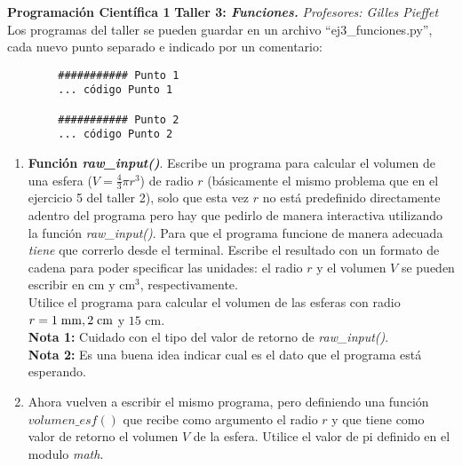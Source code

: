 \documentclass[10pt, twocolumn]{article}
\begin{document}
\noindent
{\Large \bf Programación Científica 1}
\vskip 0.3cm
\noindent
{\large \bf Taller 3: {\it Funciones.}}
\vskip 0.2cm
\noindent
{\it Profesores:  Gilles Pieffet}\\


\noindent
Los programas del taller se pueden guardar en un archivo ``ej3\_funciones.py'', cada nuevo punto separado e indicado por un comentario:
	\begin{verbatim}
		########### Punto 1
		... código Punto 1
		
		########### Punto 2
		... código Punto 2
	\end{verbatim}
	
\begin{enumerate}

	\item {\bf Función \emph{raw\_input()}}. Escribe un programa para calcular el volumen de una esfera ($V = \frac43 \pi r^3$) de radio $r$ (básicamente el mismo problema que en el ejercicio 5 del taller 2), solo que esta vez $r$ no está predefinido directamente adentro del programa pero hay que pedirlo de manera interactiva utilizando la función \emph{raw\_input()}. Para que el programa funcione de manera adecuada \emph{tiene} que correrlo desde el terminal. Escribe el resultado con un formato de cadena para poder specificar las unidades: el radio $r$ y el volumen $V$ se pueden escribir en cm y cm$^3$, respectivamente.\\ 
Utilice el programa para calcular el volumen de las esferas con radio $r = 1\;\rm{mm}, 2\;\rm{cm}$ y $15$ cm.\\
{\bf Nota 1:} Cuidado con el tipo del valor de retorno de \emph{raw\_input()}.\\
{\bf Nota 2:} Es una buena idea indicar cual es el dato que el programa está esperando.

	\item Ahora vuelven a escribir el mismo programa, pero definiendo una función $volumen\_esf()$ que recibe como argumento el radio $r$ y que tiene como valor de retorno el volumen $V$ de la esfera. Utilice el valor de pi definido en el modulo \emph{math}.


\end{enumerate}
\end{document}
